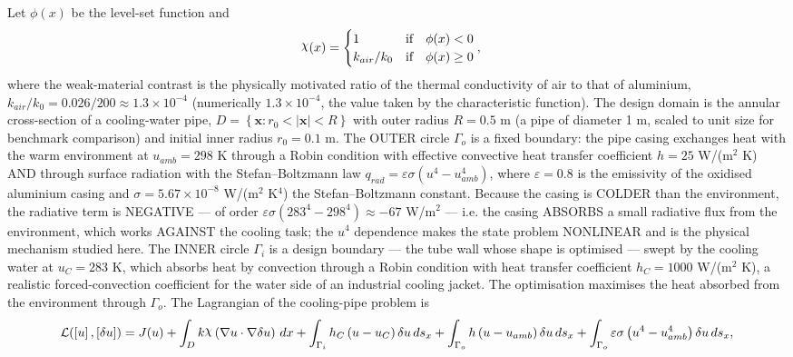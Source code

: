\documentclass[preview]{standalone}
\let\oldcdot\cdot
\let\cdot\oldcdot
\begin{document}
Let $\phi(x)$ be the level-set function and
 \begin{align*}\raisebox{\depth}{$\chi$}(x) &= \begin{cases} 1 & \mbox{if}\quad \phi(x) < 0 \\ k_{air}/k_0 & \mbox{if}\quad \phi(x)  \ge 0 \end{cases},\end{align*}
where the weak-material contrast is the physically motivated ratio of the thermal conductivity of air to that of aluminium, $k_{air}/k_0 = 0.026/200 \approx 1.3 \times 10^{-4}$ (numerically $1.3 \times 10^{-4}$, the value taken by the characteristic function).
The design domain is the annular cross-section of a cooling-water pipe, $D = \left\{ \mathbf x : r_0 < \left|\mathbf x\right| < R \right\}$ with outer radius $R = 0.5$ m (a pipe of diameter 1 m, scaled to unit size for benchmark comparison) and initial inner radius $r_0 = 0.1$ m.  The OUTER circle $\Gamma_o$ is a fixed boundary: the pipe casing exchanges heat with the warm environment at $u_{amb} = 298$ K through a Robin condition with effective convective heat transfer coefficient $h = 25$ W/(m$^{2}$ K) AND through surface radiation with the Stefan--Boltzmann law $q_{rad} = \varepsilon \sigma \left( u^{4} - u_{amb}^{4}\right)$, where $\varepsilon = 0.8$ is the emissivity of the oxidised aluminium casing and $\sigma = 5.67 \times 10^{-8}$ W/(m$^{2}$ K$^{4}$) the Stefan--Boltzmann constant.  Because the casing is COLDER than the environment, the radiative term is NEGATIVE — of order $\varepsilon \sigma \left(283^{4} - 298^{4}\right) \approx -67$ W/m$^{2}$ — i.e. the casing ABSORBS a small radiative flux from the environment, which works AGAINST the cooling task; the $u^{4}$ dependence makes the state problem NONLINEAR and is the physical mechanism studied here.  The INNER circle $\Gamma_i$ is a design boundary — the tube wall whose shape is optimised — swept by the cooling water at $u_C = 283$ K, which absorbs heat by convection through a Robin condition with heat transfer coefficient $h_C = 1000$ W/(m$^{2}$ K), a realistic forced-convection coefficient for the water side of an industrial cooling jacket.  The optimisation maximises the heat absorbed from the environment through $\Gamma_o$.
The Lagrangian of the cooling-pipe problem is
\begin{dmath*}
\mathcal L(\left[ u\right],\left[ \delta u\right]) = J(u) +  \int_{D} k \raisebox{\depth}{$\chi$} \left(  \nabla u  \cdot  \nabla \delta u  \right) \,dx + \int_{\Gamma_i} h_C \left( u - u_{C}\right) \delta u \,ds_x + \int_{\Gamma_o} h \left( u - u_{amb}\right) \delta u \,ds_x + \int_{\Gamma_o} \varepsilon \sigma \left( u^{4} - u_{amb}^{4}\right) \delta u \,ds_x ,
\end{dmath*}
\end{document}
